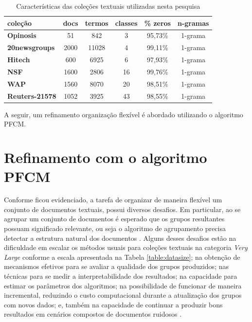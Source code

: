 \begin{table}[!htp]
  \centering
  \begin{tabular}{ |l|c c c c c|}
    \hline
    {\bf coleção} & {\bf docs} & {\bf termos} & {\bf classes} & {\bf \% zeros} & {\bf n-gramas} \\
    \hline
    {\bf Opinosis} & 51 & 842 & 3 & 95,73\% & 1-grama \\
    \hline
    {\bf 20newsgroups} & 2000 & 11028 & 4 & 99,11\% & 1-grama \\
    \hline
    {\bf Hitech} & 600 & 6925 & 6 & 97,93\% & 1-grama \\
    \hline
    {\bf NSF} & 1600 & 2806 & 16 & 99,76\% & 1-grama \\
    \hline
    {\bf WAP} & 1560 & 8070 & 20 & 98,51\% & 1-grama \\
    \hline
    {\bf Reuters-21578} & 1052 & 3925 & 43 & 98,55\% & 1-grama \\
    \hline
  \end{tabular}
  \caption{Características das coleções textuais utilizadas nesta pesquisa}
  \label{table:datasets}
\end{table}

A seguir, um refinamento organização flexível é abordado utilizando o algoritmo PFCM.

\section{Refinamento com o algoritmo PFCM}
\label{sec:exppfcm}

Conforme ficou evidenciado, a tarefa de organizar de maneira flexível um conjunto de documentos
textuais, possui diversos desafios. Em particular, ao se agrupar um conjunto de documentos é
esperado que os grupos resultantes possuam significado relevante, ou seja o algoritmo de
agrupamento precisa detectar a estrutura natural dos documentos \cite{Steinbach2004}. Alguns desses 
desafios estão na dificuldade em escalar os métodos usuais para coleções textuais na categoria {\it Very Large}
conforme a escala apresentada na Tabela \ref{table:datasize}; na obtenção de
mecanismos efetivos para se avaliar a qualidade dos grupos produzidos; nas técnicas para se medir a
interpretabilidade dos resultados; na capacidade para estimar os parâmetros dos algoritmos;
na possibilidade de funcionar de maneira incremental, reduzindo o custo computacional durante a
atualização dos grupos com novos dados; e, também na capacidade de continuar a produzir bons
resultados em cenários compostos de documentos ruidosos \cite{Carvalho2016}. 

